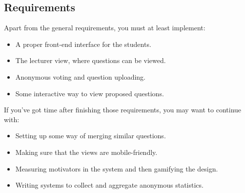\begin{refsection}
\subsection*{Requirements}
Apart from the general requirements, you must at least implement:
\begin{itemize}
    \item A proper front-end interface for the students.
	\item The lecturer view, where questions can be viewed.
	\item Anonymous voting and question uploading.
    \item Some interactive way to view proposed questions.
\end{itemize}
If you've got time after finishing those requirements, you may want to continue with:
\begin{itemize}
    \item Setting up some way of merging similar questions.
    \item Making sure that the views are mobile-friendly.
	\item Measuring motivators in the system and then gamifying the design.
	\item Writing systems to collect and aggregate anonymous statistics.
\end{itemize}
\end{refsection}

